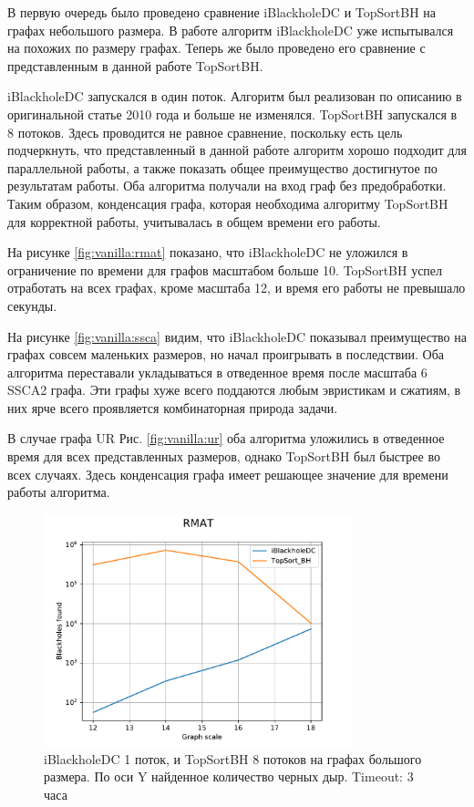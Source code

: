 \documentclass[12pt,a4paper,oneside,openany]{article}
\theoremstyle{definition}
\theoremstyle{lemma}
\theoremstyle{remark}
\begin{document}
В первую очередь было проведено сравнение iBlackholeDC и TopSortBH на графах небольшого размера.
В работе \cite{li2010detecting} алгоритм iBlackholeDC уже испытывался на похожих по размеру графах.
Теперь же было проведено его сравнение с представленным в данной работе TopSortBH.

iBlackholeDC запускался в один поток. Алгоритм был реализован по описанию в оригинальной статье 2010
года и больше не изменялся.
TopSortBH запускался в 8 потоков. Здесь проводится не равное сравнение, поскольку
есть цель подчеркнуть, что представленный в данной работе алгоритм хорошо подходит для параллельной работы, а также
показать общее преимущество достигнутое по результатам работы.
Оба алгоритма получали на вход граф без предобработки. Таким образом, конденсация графа,
которая необходима алгоритму TopSortBH для корректной работы, учитывалась в общем времени его работы.

На рисунке \ref{fig:vanilla:rmat} показано, что iBlackholeDC не уложился в ограничение по времени для графов масштабом больше 10.
TopSortBH успел отработать на всех графах, кроме масштаба 12, и время его работы не превышало секунды.

На рисунке \ref{fig:vanilla:ssca} видим, что iBlackholeDC показывал преимущество на графах совсем маленьких размеров, но начал проигрывать в последствии.
Оба алгоритма переставали укладываться в отведенное время после масштаба 6 SSCA2 графа. Эти графы хуже всего поддаются любым эвристикам и сжатиям,
в них ярче всего проявляется комбинаторная природа задачи.

В случае графа UR Рис. \ref{fig:vanilla:ur} оба алгоритма уложились в отведенное время для всех представленных размеров, однако TopSortBH был быстрее во всех
случаях. Здесь конденсация графа имеет решающее значение для времени работы алгоритма.

\begin{figure}[H]
    \centering
    \includegraphics[width=0.8\textwidth]{images/1_large_RMAT.pdf}
    \caption{iBlackholeDC 1 поток, и TopSortBH 8 потоков на графах большого размера. По оси Y найденное количество черных дыр. Timeout: 3 часа}
    \label{fig:vanillalarge}
\end{figure}
\end{document}
